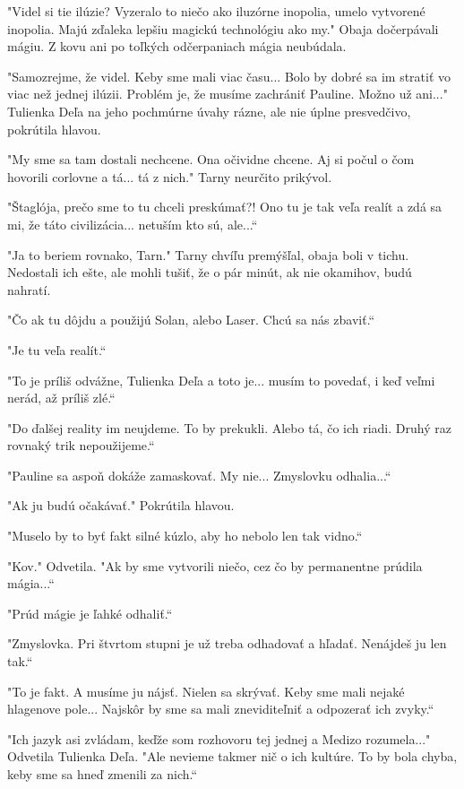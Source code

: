 \documentclass{book}
\begin{document}
"$ $Videl si tie ilúzie? Vyzeralo to niečo ako iluzórne inopolia, umelo vytvorené inopolia. Majú zďaleka lepšiu magickú technológiu ako my."$ $ Obaja dočerpávali mágiu. Z kovu ani po toľkých odčerpaniach mágia neubúdala.

"$ $Samozrejme, že videl. Keby sme mali viac času... Bolo by dobré sa im stratiť vo viac než jednej ilúzii. Problém je, že musíme zachrániť Pauline. Možno už ani..."$ $ Tulienka Deľa na jeho pochmúrne úvahy rázne, ale nie úplne presvedčivo, pokrútila hlavou.

"$ $My sme sa tam dostali nechcene. Ona očividne chcene. Aj si počul o čom hovorili corlovne a tá... tá z nich."$ $ Tarny neurčito prikývol.

"$ $Štaglója, prečo sme to tu chceli preskúmať?! Ono tu je tak veľa realít a zdá sa mi, že táto civilizácia... netuším kto sú, ale...“

"$ $Ja to beriem rovnako, Tarn."$ $ Tarny chvíľu premýšľal, obaja boli v tichu. Nedostali ich ešte, ale mohli tušiť, že o pár minút, ak nie okamihov, budú nahratí.

"$ $Čo ak tu dôjdu a použijú Solan, alebo Laser. Chcú sa nás zbaviť.“

"$ $Je tu veľa realít.“

"$ $To je príliš odvážne, Tulienka Deľa a toto je... musím to povedať, i keď veľmi nerád, až príliš zlé.“

"$ $Do ďalšej reality im neujdeme. To by prekukli. Alebo tá, čo ich riadi. Druhý raz rovnaký trik nepoužijeme.“

"$ $Pauline sa aspoň dokáže zamaskovať. My nie... Zmyslovku odhalia...“

"$ $Ak ju budú očakávať."$ $ Pokrútila hlavou.

"$ $Muselo by to byť fakt silné kúzlo, aby ho nebolo len tak vidno.“

"$ $Kov."$ $ Odvetila. "$ $Ak by sme vytvorili niečo, cez čo by permanentne prúdila mágia...“

"$ $Prúd mágie je ľahké odhaliť.“

"$ $Zmyslovka. Pri štvrtom stupni je už treba odhadovať a hľadať. Nenájdeš ju len tak.“

"$ $To je fakt. A musíme ju nájsť. Nielen sa skrývať. Keby sme mali nejaké hlagenove pole... Najskôr by sme sa mali zneviditeľniť a odpozerať ich zvyky.“

"$ $Ich jazyk asi zvládam, keďže som rozhovoru tej jednej a Medizo rozumela..."$ $ Odvetila Tulienka Deľa. "$ $Ale nevieme takmer nič o ich kultúre. To by bola chyba, keby sme sa hneď zmenili za nich.“
\end{document}
